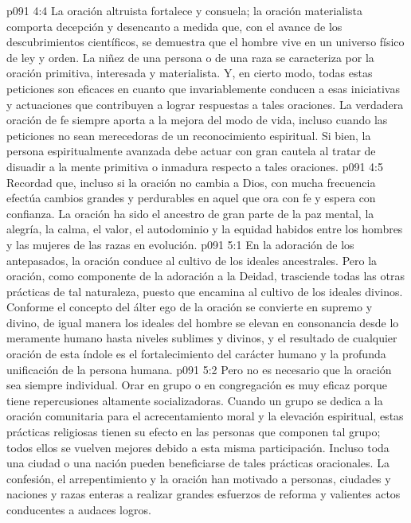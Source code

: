 \vs p091 4:4 La oración altruista fortalece y consuela; la oración materialista comporta decepción y desencanto a medida que, con el avance de los descubrimientos científicos, se demuestra que el hombre vive en un universo físico de ley y orden. La niñez de una persona o de una raza se caracteriza por la oración primitiva, interesada y materialista. Y, en cierto modo, todas estas peticiones son eficaces en cuanto que invariablemente conducen a esas iniciativas y actuaciones que contribuyen a lograr respuestas a tales oraciones. La verdadera oración de fe siempre aporta a la mejora del modo de vida, incluso cuando las peticiones no sean merecedoras de un reconocimiento espiritual. Si bien, la persona espiritualmente avanzada debe actuar con gran cautela al tratar de disuadir a la mente primitiva o inmadura respecto a tales oraciones.
\vs p091 4:5 \pc Recordad que, incluso si la oración no cambia a Dios, con mucha frecuencia efectúa cambios grandes y perdurables en aquel que ora con fe y espera con confianza. La oración ha sido el ancestro de gran parte de la paz mental, la alegría, la calma, el valor, el autodominio y la equidad habidos entre los hombres y las mujeres de las razas en evolución.
\vs p091 5:1 En la adoración de los antepasados, la oración conduce al cultivo de los ideales ancestrales. Pero la oración, como componente de la adoración a la Deidad, trasciende todas las otras prácticas de tal naturaleza, puesto que encamina al cultivo de los ideales divinos. Conforme el concepto del álter ego de la oración se convierte en supremo y divino, de igual manera los ideales del hombre se elevan en consonancia desde lo meramente humano hasta niveles sublimes y divinos, y el resultado de cualquier oración de esta índole es el fortalecimiento del carácter humano y la profunda unificación de la persona humana.
\vs p091 5:2 Pero no es necesario que la oración sea siempre individual. Orar en grupo o en congregación es muy eficaz porque tiene repercusiones altamente socializadoras. Cuando un grupo se dedica a la oración comunitaria para el acrecentamiento moral y la elevación espiritual, estas prácticas religiosas tienen su efecto en las personas que componen tal grupo; todos ellos se vuelven mejores debido a esta misma participación. Incluso toda una ciudad o una nación pueden beneficiarse de tales prácticas oracionales. La confesión, el arrepentimiento y la oración han motivado a personas, ciudades y naciones y razas enteras a realizar grandes esfuerzos de reforma y valientes actos conducentes a audaces logros.

